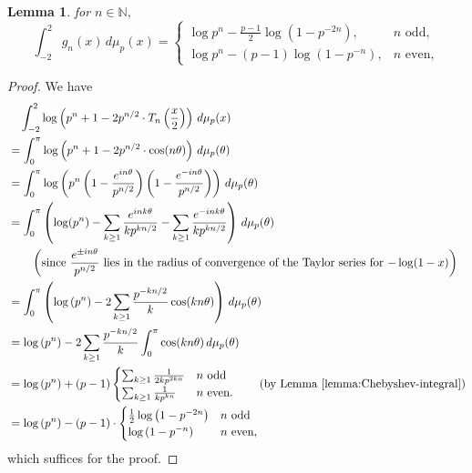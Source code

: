 \documentclass[11pt,letterpaper,reqno]{amsart}
\newtheorem{lemma}[theorem]{Lemma}
\theoremstyle{definition}
\numberwithin{equation}{section}
\numberwithin{figure}{section}
\numberwithin{table}{section}
\begin{document}
\begin{lemma}\label{lem:g-integral}
    for $n \in \mathbb{N},$
    $$\int_{-2}^{2}
g_n(x)\,d\mu_p(x) = \begin{cases}
\displaystyle \log p^n-\frac{p-1}{2}\log\!\left(1- p^{-2n}\right),
& \text{$n$ odd},\\[10pt]
\displaystyle \log p^n -(p-1)\log\!\left(1-p^{-n}\right),
& \text{$n$ even},
\end{cases}$$
\end{lemma}
\begin{proof}
    We have
    \begin{align}
        &\quad \int_{-2}^2 \log\left( p^n + 1 - 2p^{n/2} \cdot T_n \left( \frac{x}{2} \right)  \right) \, d \mu_p(x)\\
        &= \int_{0}^\pi \log\left( p^n + 1 - 2p^{n/2} \cdot \cos (n \theta)  \right) \, d \mu_p(\theta)\\
        &= \int_{0}^\pi \log\left( p^n \left( 1 - \frac{e^{in\theta}}{p^{n/2}} \right)\left( 1 - \frac{e^{-in\theta}}{p^{n/2}} \right)  \right) \, d \mu_p(\theta)\\
        &= \int_{0}^\pi \left( \log(p^n) - \sum_{k \geq 1} \frac{e^{ink \theta}}{k p^{kn/2}} - \sum_{k \geq 1} \frac{e^{-ink \theta}}{k p^{kn/2}} \right) \, d \mu_p(\theta)\\
        & \qquad \left( \text{since $\frac{e^{\pm i n \theta}}{p^{n/2}}$ lies in the radius of convergence of the Taylor series for $-\log(1 - x)$} \right)\\
        &= \int_0^\pi \left( \log \left( p^n \right) - 2 \sum_{k \geq 1} \frac{p^{-kn/2}}{k} \cos(kn \theta)  \right) \, d \mu_p(\theta)\\
        &= \log \left( p^n \right) - 2 \sum_{k \geq 1} \frac{p^{-kn/2}}{k} \int_0^\pi \cos(kn \theta) \, d \mu_p(\theta)\\
        &= \log \left( p^n \right) + (p - 1) \begin{cases}
        \sum_{k \geq 1} \frac{1}{2k p^{2kn}}  & \text{$n$ odd}\\
        \sum_{k \geq 1} \frac{1}{k p^{kn}} & \text{$n$ even}.
    \end{cases} \qquad \left( \text{by Lemma \ref{lemma:Chebyshev-integral}}  \right)\\
    &= \log \left( p^n \right) - (p - 1) \cdot \begin{cases}
        \frac{1}{2}\log \left(1 - p^{-2n} \right) & \text{$n$ odd}\\
        \log \left(1 - p^{-n}\right) & \text{$n$ even},
    \end{cases}
    \end{align}
    which suffices for the proof.
\end{proof}
\end{document}
